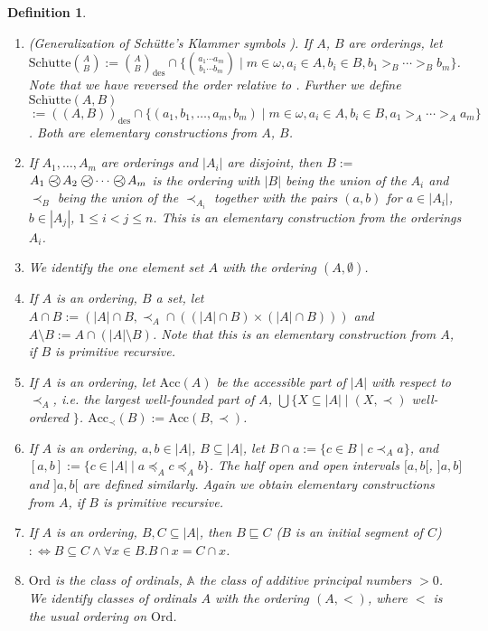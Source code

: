 \documentclass[10pt]{article}
\def \ssubitem#1{\item \label{\actlabel#1} }
\newtheorem {definition} [lemma]{Definition}
\def\all{\forall}
\def \Iff{\Leftrightarrow}
\def \cross{\times}
\def\des{\mathrm{des}}
\def\schuette{\mathrm{Sch\ddot{u}tte}}
\def\APN{\mathbb{A}}
\def\preccirc{\mathrel{\bigcirc \kern-12pt \prec}} %
\def\Ord{\mathrm{Ord}}
\def\Acc{\mathrm{Acc}}
\def \segment{\sqsubseteq}
\def\underlinedef#1{{\it #1}}
\begin{document}
\begin{definition}
{\begin{enumerate}
$(A,B)_\des$ and 
$\binom{a_1 \cdots a_m}{b_1 \cdots b_m}$
instead of $\left (\binom{a_1}{b_1} \cdots \binom{a_m}{b_m}\right )$  
for an element of  ${\binom{A}{B}}^\ast_\des$.
Obviously $A^\ast_\des$ is an elementary construction from $A$.
\ssubitem {da} (Generalization of Sch{\"u}tte's Klammer symbols 
\cite{Schuette54}).
If $A$, $B$ are orderings, let\\
$\schuette {\binom{A}{B}}:=
{\binom{A}{B}}_\des \cap 
\{ {\binom{a_1 \cdots a_m}{b_1 \cdots b_m}}
\mid m \in \omega,a_i \in A, b_i \in B, b_1 >_B \cdots >_B b_m \} $. Note that we have
reversed the order relative to \cite{Schuette54}.
Further we define
$\schuette(A,B)  $\\
$:=((A ,B))_\des \cap 
\{(a_1,b_1 ,\ldots, a_m,b_m)\mid 
m \in \omega, a_i \in A, b_i \in B, a_1 >_A \cdots >_A a_m \} $.
Both are elementary constructions from $A$, $B$.
\ssubitem e
If $A_1 ,\ldots, A_m$ are orderings and $|A_i|$ are  disjoint, then
$B:= $\underlinedef{$A_1 \preccirc A_2 \preccirc \cdots \preccirc A_m$}
is the ordering with
$|B|$ being the union of the $A_i$ and
$\prec_B$ being the union of the $\prec_{A_i}$ 
together with the pairs $(a,b)$ for $a \in |A_i|$, $b \in |A_j|$,
$1 \leq i < j \leq n$.
This is an elementary construction from the orderings
$A_i$.
\ssubitem f We identify the one element set $A$ with the
ordering $(A,\emptyset)$.
\ssubitem g If $A$ is an ordering,
$B$ a set, let
$A \cap B
:= (|A| \cap B,\prec_A \cap ((|A|\cap B) \cross (|A|\cap B)))$ and
$A \setminus B:= A \cap (|A| \setminus B)$.
Note that this is an elementary construction from $A$,
if $B$ is primitive recursive.
\ssubitem h If $A$ is an ordering, let $\Acc(A)$ be the
accessible part of $|A|$ with respect to $\prec_A$,
i.e. the largest well-founded part of $A$,
$\bigcup \{ X \subseteq |A| \mid (X,\prec)$ well-ordered $\} $.
$\Acc_\prec(B):= \Acc(B,\prec)$. 
\ssubitem i If $A$ is an ordering, $a,b \in |A|$,
$B \subseteq |A|$, let $B \cap a:= \{ c \in B \mid 
c \prec_A a \} $,
and $[a,b]:= \{ c \in |A| \mid a \preceq_A c \preceq_A b \}$. The
half open and open intervals 
$[a,b[$, $]a,b]$ and $]a,b[$ are defined similarly.
Again we obtain elementary constructions from $A$, if
$B$ is primitive recursive.
\ssubitem j If $A$ is an ordering, $B,C \subseteq |A|$, then
$B \segment C$ ({\em $B$ is an initial segment of $C$}) 
$:\Iff B \subseteq C \land 
\all x \in B. B \cap x = C \cap x$.
\ssubitem k $\Ord$ is the class of ordinals,
$\APN$ the class of additive principal numbers $>0$.\\
We identify classes of ordinals $A$ with the ordering
$(A,<)$, where $<$ is the usual ordering on $\Ord$.
\end{enumerate} }
\end{definition}
\end{document}
